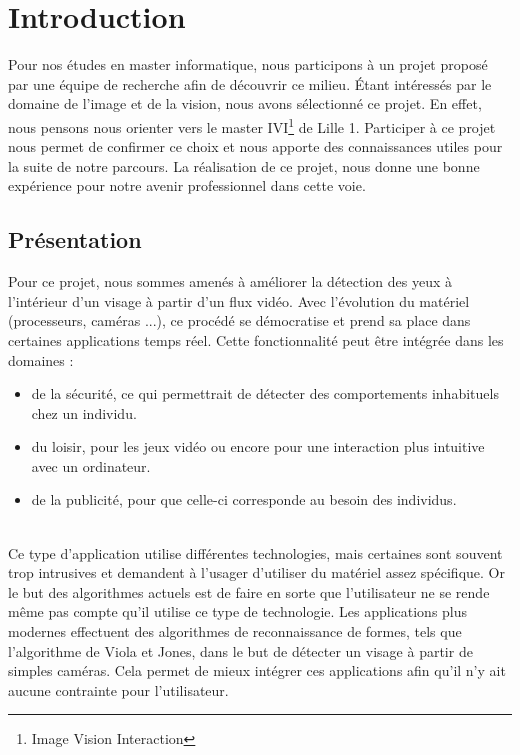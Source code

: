 \section{Introduction}

Pour nos études en master informatique, nous participons à un projet proposé par une 
équipe de recherche afin de découvrir ce milieu. 
Étant intéressés par le domaine de l'image et de la vision, nous avons sélectionné ce projet. 
En effet, nous pensons nous orienter vers le master IVI\footnote{Image Vision Interaction} de 
Lille 1. Participer à ce projet nous permet de confirmer ce choix et nous apporte des 
connaissances utiles pour la suite de notre parcours. La réalisation de ce projet, nous donne une bonne expérience pour notre 
avenir professionnel dans cette voie.\\

\subsection{Présentation}
Pour ce projet, nous sommes amenés à améliorer la détection des yeux à l'intérieur d'un visage à partir d'un flux vidéo.
Avec l'évolution du matériel (processeurs, caméras ...), ce procédé se démocratise et prend sa place 
dans certaines applications temps réel. Cette fonctionnalité peut être intégrée dans les domaines : 
\begin{itemize}
 \item de la sécurité, ce qui permettrait de détecter des comportements inhabituels chez un individu.
 \item du loisir, pour les jeux vidéo ou encore pour une interaction plus intuitive avec un ordinateur.
 \item de la publicité, pour que celle-ci corresponde au besoin des individus. 
\end{itemize}
\ \\
Ce type d'application utilise différentes technologies, mais certaines sont souvent trop intrusives 
et demandent à l'usager d'utiliser du matériel assez spécifique. Or le but des algorithmes actuels
est de faire en sorte que l'utilisateur ne se rende même pas compte qu'il utilise ce type de technologie. Les applications plus 
modernes effectuent des algorithmes de reconnaissance de formes, tels que l'algorithme de Viola et Jones, dans 
le but de détecter un visage à partir de simples caméras. Cela permet de mieux intégrer ces applications 
afin qu'il n'y ait aucune contrainte pour l'utilisateur.\\

